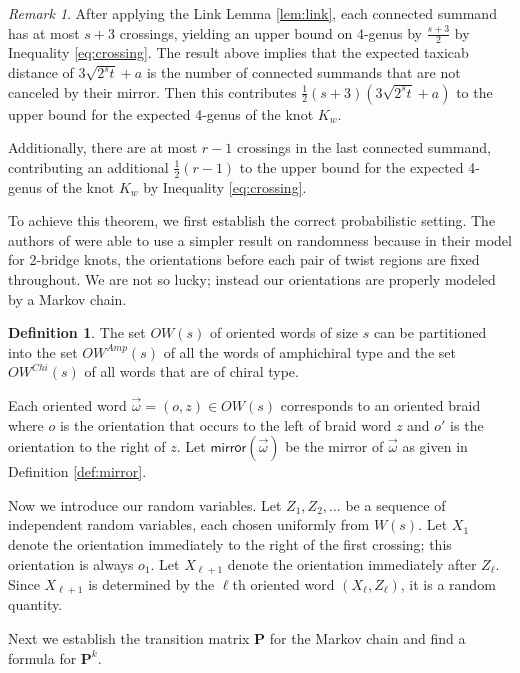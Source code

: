 \documentclass[12pt]{amsart}
\theoremstyle{definition}
\newtheorem{definition}[theorem]{Definition}
\theoremstyle{remark}
\newtheorem{remark}[theorem]{Remark}
\numberwithin{equation}{section}
\newcommand{\mirror}{\textsf{mirror}}
\begin{document}
\begin{remark}
\label{rem:randomwalkdistance}
After applying the Link Lemma \ref{lem:link}, each connected summand has at most $s+3$ crossings, yielding an upper bound on 4-genus by $\frac{s+3}{2}$ by Inequality \ref{eq:crossing}.  The result above implies that the expected taxicab distance of $3\sqrt{2^s t} +a$ is the number of connected summands that are not canceled by their mirror.  Then this contributes $\frac{1}{2}(s+3)(3\sqrt{2^s t} +a)$ to the upper bound for the expected 4-genus of the knot $K_w$.

Additionally, there are at most $r-1$ crossings in the last connected summand, contributing an additional $\frac{1}{2}(r-1)$ to the upper bound for the expected 4-genus of the knot $K_w$ by Inequality \ref{eq:crossing}.
\end{remark}

 To achieve this theorem, we first establish the correct probabilistic setting.  The authors of \cite{BKLMR} were able to use a simpler result on randomness because in their model for 2-bridge knots, the orientations before each pair of twist regions are fixed throughout.  We are not so lucky; instead our orientations are properly modeled by a Markov chain.

\begin{definition}
\label{def:random}
The set $OW(s)$ of oriented words of size $s$ can be partitioned into the set $OW^{Amp}(s)$ of all the words of amphichiral type and the set $OW^{Chi}(s)$ of all words that are of chiral type.

Each oriented word $\vec{\omega}=(o,z)\in OW(s)$ corresponds to an oriented braid where $o$ is the orientation that occurs to the left of braid word $z$ and $o'$ is the orientation to the right of $z$.  Let $\mirror(\vec{\omega})$ be the mirror of $\vec{\omega}$ as given in Definition \ref{def:mirror}.

Now we introduce our random variables.  Let $Z_1,Z_2,\ldots$ be a sequence of independent random variables, each chosen uniformly from $W(s)$.  
Let $X_1$ denote the orientation immediately to the right of the first crossing; this orientation is always $o_1$. 
 Let $X_{\ell+1}$ denote the orientation immediately after $Z_\ell$. Since $X_{\ell+1}$ is determined by the $\ell$th oriented word $(X_\ell,Z_\ell)$, it is a random quantity.
\end{definition}


Next we establish the transition matrix $\mathbf{P}$ for the Markov chain and find a formula for $\mathbf{P}^k$.
\end{document}
